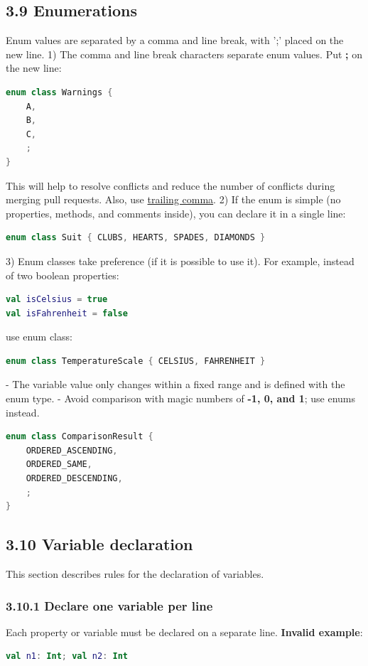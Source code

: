 \subsection*{\textbf{3.9 Enumerations}}
\label{sec:3.9}
Enum values are separated by a comma and line break, with ';' placed on the new line.
1) The comma and line break characters separate enum values. Put \textbf{;} on the new line:
\begin{lstlisting}[language=Kotlin]
enum class Warnings {
    A,
    B,
    C,
    ;
}
\end{lstlisting}
This will help to resolve conflicts and reduce the number of conflicts during merging pull requests.
Also, use \href{https://kotlinlang.org/docs/reference/whatsnew14.html#trailing-comma}{trailing comma}.
2) If the enum is simple (no properties, methods, and comments inside), you can declare it in a single line:
\begin{lstlisting}[language=Kotlin]
enum class Suit { CLUBS, HEARTS, SPADES, DIAMONDS }
\end{lstlisting}
3) Enum classes take preference (if it is possible to use it). For example, instead of two boolean properties:
\begin{lstlisting}[language=Kotlin]
val isCelsius = true
val isFahrenheit = false
\end{lstlisting}
use enum class:
\begin{lstlisting}[language=Kotlin]
enum class TemperatureScale { CELSIUS, FAHRENHEIT }
\end{lstlisting}
- The variable value only changes within a fixed range and is defined with the enum type.
- Avoid comparison with magic numbers of \textbf{-1, 0, and 1}; use enums instead.
\begin{lstlisting}[language=Kotlin]
enum class ComparisonResult {
    ORDERED_ASCENDING,
    ORDERED_SAME,
    ORDERED_DESCENDING,
    ;
}
\end{lstlisting}
\subsection*{\textbf{3.10 Variable declaration}}
\label{sec:3.10}
This section describes rules for the declaration of variables.
\subsubsection*{\textbf{3.10.1 Declare one variable per line}}
\leavevmode\newline
\label{sec:3.10.1}
Each property or variable must be declared on a separate line.
\textbf{Invalid example}:
\begin{lstlisting}[language=Kotlin]
val n1: Int; val n2: Int
\end{lstlisting}
